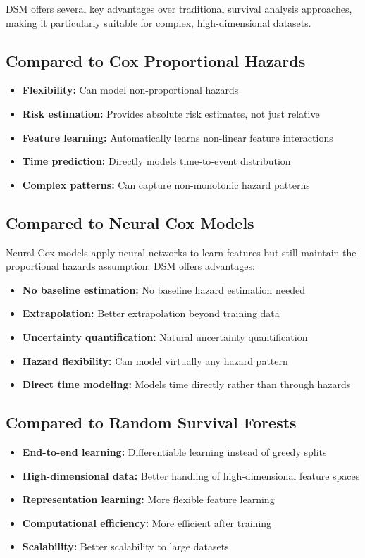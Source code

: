 DSM offers several key advantages over traditional survival analysis approaches, making it particularly suitable for complex, high-dimensional datasets.

\subsection{Compared to Cox Proportional Hazards}

\begin{itemize}
    \item \textbf{Flexibility:} Can model non-proportional hazards
    \item \textbf{Risk estimation:} Provides absolute risk estimates, not just relative
    \item \textbf{Feature learning:} Automatically learns non-linear feature interactions
    \item \textbf{Time prediction:} Directly models time-to-event distribution
    \item \textbf{Complex patterns:} Can capture non-monotonic hazard patterns
\end{itemize}

\subsection{Compared to Neural Cox Models}

Neural Cox models apply neural networks to learn features but still maintain the proportional hazards assumption. DSM offers advantages:
\begin{itemize}
    \item \textbf{No baseline estimation:} No baseline hazard estimation needed
    \item \textbf{Extrapolation:} Better extrapolation beyond training data
    \item \textbf{Uncertainty quantification:} Natural uncertainty quantification
    \item \textbf{Hazard flexibility:} Can model virtually any hazard pattern
    \item \textbf{Direct time modeling:} Models time directly rather than through hazards
\end{itemize}

\subsection{Compared to Random Survival Forests}

\begin{itemize}
    \item \textbf{End-to-end learning:} Differentiable learning instead of greedy splits
    \item \textbf{High-dimensional data:} Better handling of high-dimensional feature spaces
    \item \textbf{Representation learning:} More flexible feature learning
    \item \textbf{Computational efficiency:} More efficient after training
    \item \textbf{Scalability:} Better scalability to large datasets
\end{itemize}

